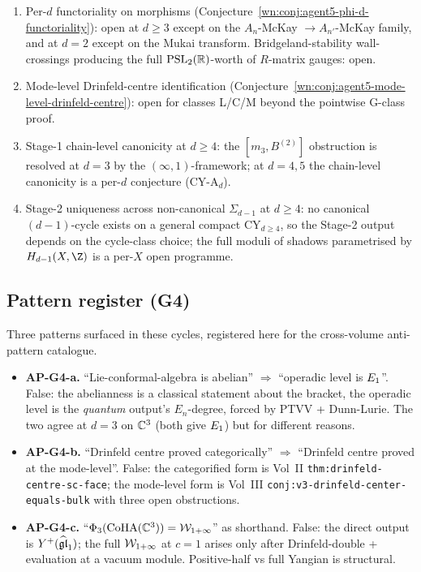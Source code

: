 \begin{enumerate}
\item[(G4-1)] Per-$d$ functoriality on morphisms
(Conjecture~\ref{wn:conj:agent5-phi-d-functoriality}): open at
$d \ge 3$ except on the $A_n$-McKay $\to A_{n'}$-McKay family, and at
$d = 2$ except on the Mukai transform. Bridgeland-stability
wall-crossings producing the full $\mathrm{PSL}_2(\mathbb{R})$-worth of
$R$-matrix gauges: open.
\item[(G4-2)] Mode-level Drinfeld-centre identification
(Conjecture~\ref{wn:conj:agent5-mode-level-drinfeld-centre}): open for
classes L/C/M beyond the pointwise G-class proof.
\item[(G4-3)] Stage-1 chain-level canonicity at $d \ge 4$: the
$[m_3, B^{(2)}]$ obstruction is resolved at $d = 3$ by the
$(\infty,1)$-framework; at $d = 4, 5$ the chain-level canonicity is a
per-$d$ conjecture (CY-A$_d$).
\item[(G4-4)] Stage-2 uniqueness across non-canonical $\Sigma_{d-1}$ at
$d \ge 4$: no canonical $(d-1)$-cycle exists on a general compact
CY$_{d \ge 4}$, so the Stage-2 output depends on the cycle-class choice;
the full moduli of shadows parametrised by $H_{d-1}(X, \Z)$ is a
per-$X$ open programme.
\end{enumerate}

\subsection*{Pattern register (G4)}

Three patterns surfaced in these cycles, registered here for the
cross-volume anti-pattern catalogue.

\begin{itemize}
\item \textbf{AP-G4-a.} ``Lie-conformal-algebra is abelian'' $\Rightarrow$
``operadic level is $E_1$''. False: the abelianness is a classical
statement about the bracket, the operadic level is the
\emph{quantum} output's $E_n$-degree, forced by PTVV + Dunn-Lurie.
The two agree at $d = 3$ on $\mathbb{C}^3$ (both give $E_1$) but for
different reasons.
\item \textbf{AP-G4-b.} ``Drinfeld centre proved categorically''
$\Rightarrow$ ``Drinfeld centre proved at the mode-level''. False:
the categorified form is Vol~II \texttt{thm:drinfeld-centre-sc-face};
the mode-level form is Vol~III \texttt{conj:v3-drinfeld-center-equals-bulk}
with three open obstructions.
\item \textbf{AP-G4-c.} ``$\Phi_3(\mathrm{CoHA}(\mathbb{C}^3)) = \mathcal{W}_{1+\infty}$'' as
shorthand. False: the direct output is $Y^+(\widehat{\mathfrak{gl}}_1)$; the
full $\mathcal{W}_{1+\infty}$ at $c = 1$ arises only after Drinfeld-double +
evaluation at a vacuum module. Positive-half vs full Yangian is
structural.
\end{itemize}


